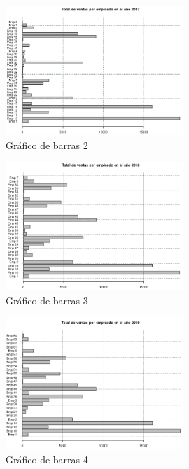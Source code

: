 \documentclass[12pt]{article}
\begin{document}
\begin{itemize}
                    \newpage
                    \begin{figure}[h]
                        \centering 
                        \includegraphics[width=0.6\textwidth]{img/grafico-barras-2.png}
                        \caption{Gráfico de barras 2}
                    \end{figure}

                    \begin{figure}[h]
                        \centering 
                        \includegraphics[width=0.6\textwidth]{img/grafico-barras-3.png}
                        \caption{Gráfico de barras 3}
                    \end{figure}

                    \newpage
                    \begin{figure}[h]
                        \centering 
                        \includegraphics[width=0.6\textwidth]{img/grafico-barras-4.png}
                        \caption{Gráfico de barras 4}
                    \end{figure}


\end{itemize}
\end{document}
